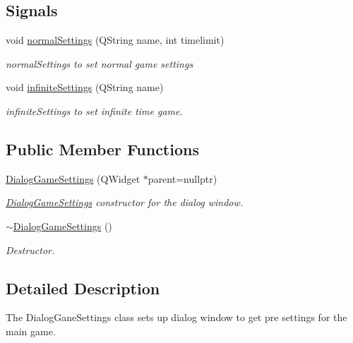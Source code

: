 \subsection*{Signals}
\begin{DoxyCompactItemize}
\item 
void \hyperlink{class_student_side_1_1_dialog_game_settings_a17dedd787d5e757bcf6ac098e91938ed}{normal\-Settings} (Q\-String name, int timelimit)
\begin{DoxyCompactList}\small\item\em normal\-Settings to set normal game settings \end{DoxyCompactList}\item 
void \hyperlink{class_student_side_1_1_dialog_game_settings_ae6867086738b0a74b518d9683539dbe8}{infinite\-Settings} (Q\-String name)
\begin{DoxyCompactList}\small\item\em infinite\-Settings to set infinite time game. \end{DoxyCompactList}\end{DoxyCompactItemize}
\subsection*{Public Member Functions}
\begin{DoxyCompactItemize}
\item 
\hyperlink{class_student_side_1_1_dialog_game_settings_a862ee1ef85f8343eddc675b6737b3a39}{Dialog\-Game\-Settings} (Q\-Widget $\ast$parent=nullptr)
\begin{DoxyCompactList}\small\item\em \hyperlink{class_student_side_1_1_dialog_game_settings}{Dialog\-Game\-Settings} constructor for the dialog window. \end{DoxyCompactList}\item 
\hyperlink{class_student_side_1_1_dialog_game_settings_a1830c64fa4518461ce233aaff1674107}{$\sim$\-Dialog\-Game\-Settings} ()
\begin{DoxyCompactList}\small\item\em Destructor. \end{DoxyCompactList}\end{DoxyCompactItemize}


\subsection{Detailed Description}
The Dialog\-Gane\-Settings class sets up dialog window to get pre settings for the main game. 

